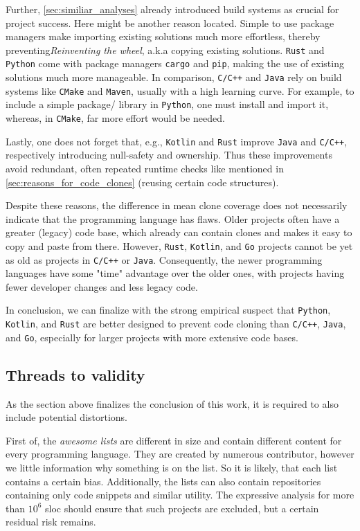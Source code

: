 Further, \autoref{sec:similiar_analyses} already introduced build systems as crucial for project success. Here might be another reason located. Simple to use package managers make importing existing solutions much more effortless, thereby preventing\textit{Reinventing the wheel}, a.k.a copying existing solutions. \texttt{Rust} and \texttt{Python} come with package managers \texttt{cargo} and \texttt{pip}, making the use of existing solutions much more manageable. In comparison, \texttt{C/C++} and \texttt{Java} rely on build systems like \texttt{CMake} and \texttt{Maven}, usually with a high learning curve. For example, to include a simple package/ library in \texttt{Python}, one must install and import it, whereas, in \texttt{CMake}, far more effort would be needed.

Lastly, one does not forget that, e.g., \texttt{Kotlin} and \texttt{Rust} improve \texttt{Java} and \texttt{C/C++}, respectively introducing null-safety and ownership. Thus these improvements avoid redundant, often repeated runtime checks like mentioned in \autoref{sec:reasons_for_code_clones} (reusing certain code structures).

Despite these reasons, the difference in mean clone coverage does not necessarily indicate that the programming language has flaws.
Older projects often have a greater (legacy) code base, which already can contain clones and makes it easy to copy and paste from there. 
However, \texttt{Rust}, \texttt{Kotlin}, and \texttt{Go} projects cannot be yet as old as projects in \texttt{C/C++} or \texttt{Java}. Consequently, the newer programming languages have some "time" advantage over the older ones, with projects having fewer developer changes and less legacy code.

In conclusion, we can finalize with the strong empirical suspect that \texttt{Python}, \texttt{Kotlin}, and \texttt{Rust} are better designed to prevent code cloning than \texttt{C/C++}, \texttt{Java}, and \texttt{Go}, especially for larger projects with more extensive code bases.

 
\subsection{Threads to validity}

As the section above finalizes the conclusion of this work, it is required to also include potential distortions.

First of, the \textit{awesome lists} are different in size and contain different content for every programming language. They are created by numerous contributor, however we little information why something is on the list. So it is likely, that each list contains a certain bias. Additionally, the lists can also contain repositories containing only code snippets and similar utility. The expressive analysis for more than $10^6$ \ac{sloc} should ensure that such projects are excluded, but a certain residual risk remains.

